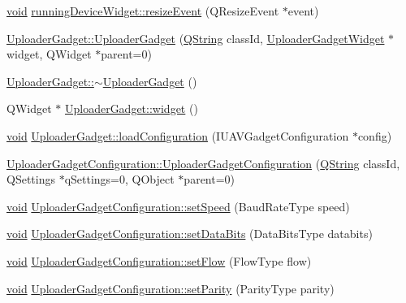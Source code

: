 \begin{DoxyCompactItemize}
\item 
\hyperlink{group___u_a_v_objects_plugin_ga444cf2ff3f0ecbe028adce838d373f5c}{void} \hyperlink{group___y_modem_uploader_ga66507a40f24abba397ae6ea6407a8d2c}{running\-Device\-Widget\-::resize\-Event} (\-Q\-Resize\-Event $\ast$event)
\item 
\hyperlink{group___y_modem_uploader_ga900f8a9e862c018370d1fa4331b55b12}{\-Uploader\-Gadget\-::\-Uploader\-Gadget} (\hyperlink{group___u_a_v_objects_plugin_gab9d252f49c333c94a72f97ce3105a32d}{\-Q\-String} class\-Id, \hyperlink{class_uploader_gadget_widget}{\-Uploader\-Gadget\-Widget} $\ast$widget, \-Q\-Widget $\ast$parent=0)
\item 
\hyperlink{group___y_modem_uploader_ga8337b51a0e1630ae11e7ce9f5a9394b9}{\-Uploader\-Gadget\-::$\sim$\-Uploader\-Gadget} ()
\item 
\-Q\-Widget $\ast$ \hyperlink{group___y_modem_uploader_gac00d0fe0b9af2cb55ca33b6f0b3ab181}{\-Uploader\-Gadget\-::widget} ()
\item 
\hyperlink{group___u_a_v_objects_plugin_ga444cf2ff3f0ecbe028adce838d373f5c}{void} \hyperlink{group___y_modem_uploader_gada75c57a2323cdfbb4d0e349d223b1a3}{\-Uploader\-Gadget\-::load\-Configuration} (\-I\-U\-A\-V\-Gadget\-Configuration $\ast$config)
\item 
\hyperlink{group___y_modem_uploader_ga1c78df01d106cba6d5b3cb6103df5588}{\-Uploader\-Gadget\-Configuration\-::\-Uploader\-Gadget\-Configuration} (\hyperlink{group___u_a_v_objects_plugin_gab9d252f49c333c94a72f97ce3105a32d}{\-Q\-String} class\-Id, \-Q\-Settings $\ast$q\-Settings=0, \-Q\-Object $\ast$parent=0)
\item 
\hyperlink{group___u_a_v_objects_plugin_ga444cf2ff3f0ecbe028adce838d373f5c}{void} \hyperlink{group___y_modem_uploader_ga44c9e2b2f4fc691f67440a125a0d3466}{\-Uploader\-Gadget\-Configuration\-::set\-Speed} (\-Baud\-Rate\-Type speed)
\item 
\hyperlink{group___u_a_v_objects_plugin_ga444cf2ff3f0ecbe028adce838d373f5c}{void} \hyperlink{group___y_modem_uploader_ga1da0d34ca3a5840687f53cdb4da50992}{\-Uploader\-Gadget\-Configuration\-::set\-Data\-Bits} (\-Data\-Bits\-Type databits)
\item 
\hyperlink{group___u_a_v_objects_plugin_ga444cf2ff3f0ecbe028adce838d373f5c}{void} \hyperlink{group___y_modem_uploader_ga69e8d13e1ed2fc41872ecf7c5447aa8b}{\-Uploader\-Gadget\-Configuration\-::set\-Flow} (\-Flow\-Type flow)
\item 
\hyperlink{group___u_a_v_objects_plugin_ga444cf2ff3f0ecbe028adce838d373f5c}{void} \hyperlink{group___y_modem_uploader_ga842e10f0bd593c16293486664f0892bd}{\-Uploader\-Gadget\-Configuration\-::set\-Parity} (\-Parity\-Type parity)

\end{DoxyCompactItemize}
